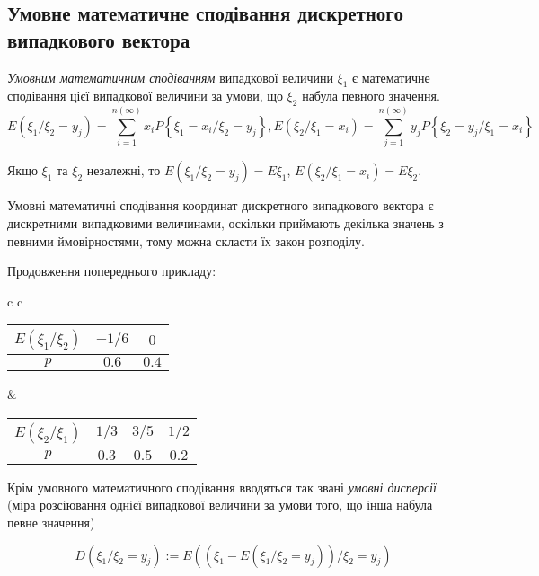 \subsection{Умовне математичне сподівання дискретного випадкового вектора}
\begin{definition}
    \emph{Умовним математичним сподіванням} випадкової величини $\xi_1$ 
    є математичне сподівання цієї випадкової величини за умови, що 
    $\xi_2$ набула певного значення.
    $$E(\xi_1 / \xi_2 = y_j) =
\sum\limits_{i=1}^{n(\infty)}x_i 
P\left\{\xi_1 = x_i / \xi_2 = y_j\right\}, 
E(\xi_2 / \xi_1 = x_i) = \sum\limits_{j=1}^{n(\infty)}y_j 
P\left\{\xi_2 = y_j / \xi_1 = x_i\right\}$$
\end{definition}

\begin{remark}
    Якщо $\xi_1$ та $\xi_2$ незалежні, то $E(\xi_1 / \xi_2 = y_j) 
    = E\xi_1$, $E(\xi_2 / \xi_1 = x_i) = E\xi_2$.
\end{remark}

Умовні математичні сподівання координат дискретного випадкового вектора є дискретними випадковими величинами, оскільки 
приймають декілька значень з певними ймовірностями, тому можна скласти 
їх закон розподілу.
\begin{example}
    Продовження попереднього прикладу:

    \begin{tabular}{c c}
        \begin{tabular}{|c|c|c|}
            \hline
            $E(\xi_1 / \xi_2)$ & $-1/6$ & $0$ \\
            \hline
            $p$ & $0.6$ & $0.4$ \\
            \hline
        \end{tabular}
        &
        \begin{tabular}{|c|c|c|c|}
            \hline
            $E(\xi_2 / \xi_1)$ & $1/3$ & $3/5$ 
            & $1/2$ \\
            \hline
            $p$ & $0.3$ & $0.5$ & $0.2$ \\
            \hline
        \end{tabular}
    \end{tabular}
\end{example}

Крім умовного математичного сподівання вводяться так звані 
\emph{умовні дисперсії} (міра розсіювання однієї випадкової величини 
за умови того, що інша набула певне значення)

\begin{equation*}
    D(\xi_1 / \xi_2 = y_j) := 
    E((\xi_1 - E(\xi_1 / \xi_2 = y_j))/\xi_2 = y_j)
\end{equation*}

